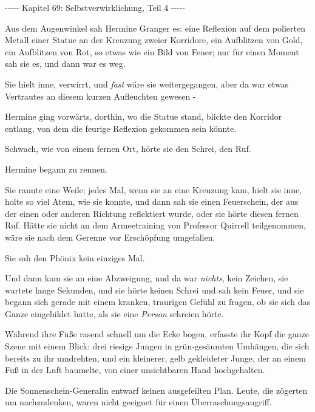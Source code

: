 

\hypertarget{selbstverwirklichung-teil-4}{%

-\/-\/-\/-\/- Kapitel 69: Selbstverwirklichung, Teil 4 -\/-\/-\/-\/-

Aus dem Augenwinkel sah Hermine Granger es: eine Reflexion auf dem polierten Metall einer Statue an der Kreuzung zweier Korridore, ein Aufblitzen von Gold, ein Aufblitzen von Rot, so etwas wie ein Bild von Feuer; nur für einen Moment sah sie es, und dann war es weg.

Sie hielt inne, verwirrt, und \emph{fast} wäre sie weitergegangen, aber da war etwas Vertrautes an diesem kurzen Aufleuchten gewesen -

Hermine ging vorwärts, dorthin, wo die Statue stand, blickte den Korridor entlang, von dem die feurige Reflexion gekommen sein könnte.

Schwach, wie von einem fernen Ort, hörte sie den Schrei, den Ruf.

Hermine begann zu rennen.

Sie rannte eine Weile; jedes Mal, wenn sie an eine Kreuzung kam, hielt sie inne, holte so viel Atem, wie sie konnte, und dann sah sie einen Feuerschein, der aus der einen oder anderen Richtung reflektiert wurde, oder sie hörte diesen fernen Ruf. Hätte sie nicht an dem Armeetraining von Professor Quirrell teilgenommen, wäre sie nach dem Gerenne vor Erschöpfung umgefallen.

Sie sah den Phönix kein einziges Mal.

Und dann kam sie an eine Abzweigung, und da war \emph{nichts}, kein Zeichen, sie wartete lange Sekunden, und sie hörte keinen Schrei und sah kein Feuer, und sie begann sich gerade mit einem kranken, traurigen Gefühl zu fragen, ob sie sich das Ganze eingebildet hatte, als sie eine \emph{Person} schreien hörte.

Während ihre Füße rasend schnell um die Ecke bogen, erfasste ihr Kopf die ganze Szene mit einem Blick: drei riesige Jungen in grün-gesäumten Umhängen, die sich bereits zu ihr umdrehten, und ein kleinerer, gelb gekleideter Junge, der an einem Fuß in der Luft baumelte, von einer unsichtbaren Hand hochgehalten.

Die Sonnenschein-Generalin entwarf keinen ausgefeilten Plan. Leute, die zögerten um nachzudenken, waren nicht geeignet für einen Überraschungsangriff.

}
